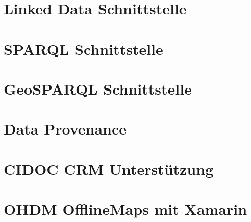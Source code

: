 \documentclass[german]{book}
\begin{document}
\chapter{Linked Data Schnittstelle}


\chapter{SPARQL Schnittstelle}


\chapter{GeoSPARQL Schnittstelle}


\chapter{Data Provenance}


\chapter{CIDOC CRM Unterstützung}


\chapter{OHDM OfflineMaps mit Xamarin}

\end{document}

